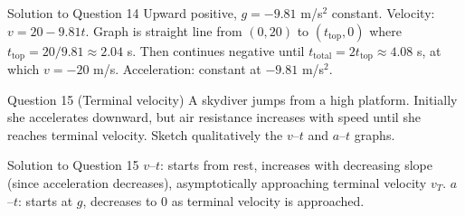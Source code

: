 \documentclass{beamer}
\begin{document}
\begin{frame}[shrink=15]{Solution to Question 14}
Upward positive, $g = -9.81$ m/s$^2$ constant.
Velocity: $v = 20 - 9.81t$. Graph is straight line from $(0,20)$ to $(t_{\text{top}},0)$ where $t_{\text{top}} = 20/9.81 \approx 2.04$ s. Then continues negative until $t_{\text{total}} = 2t_{\text{top}} \approx 4.08$ s, at which $v = -20$ m/s.
Acceleration: constant at $-9.81$ m/s$^2$.
\begin{center}
\qquad
{}
\end{center}
\end{frame}

\begin{frame}[shrink=15]{Question 15 (Terminal velocity)}
A skydiver jumps from a high platform. Initially she accelerates downward, but air resistance increases with speed until she reaches terminal velocity. Sketch qualitatively the $v$–$t$ and $a$–$t$ graphs.
\end{frame}

\begin{frame}[shrink=15]{Solution to Question 15}
$v$–$t$: starts from rest, increases with decreasing slope (since acceleration decreases), asymptotically approaching terminal velocity $v_T$.
$a$–$t$: starts at $g$, decreases to 0 as terminal velocity is approached.
\begin{center}
\qquad
{}
\end{center}
\end{frame}
\end{document}
